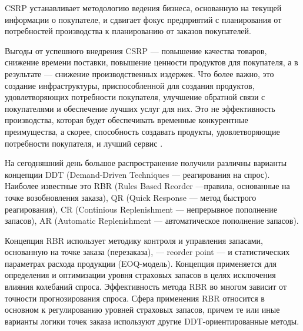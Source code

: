 CSRP устанавливает методологию ведения бизнеса, основанную на текущей информации о покупателе, и сдвигает фокус предприятий с планирования от потребностей производства к планированию от заказов покупателей.

Выгоды от успешного внедрения CSRP --- повышение качества товаров, снижение времени поставки, повышение ценности продуктов для покупателя, а в результате --- снижение производственных издержек.
Что более важно, это создание инфраструктуры, приспособленной для создания продуктов, удовлетворяющих потребности покупателя, улучшение обратной связи с покупателями и обеспечение лучших услуг для них.
Это не эффективность производства, которая будет обеспечивать временные конкурентные преимущества, а скорее, способность создавать продукты, удовлетворяющие потребности покупателя, и лучший сервис \cite[с. 490--491]{grigoryev}.

На сегодняшний день большое распространение получили различны варианты концепции DDT (Demand-Driven Techniques --- реагирования на спрос).
Наиболее известные это RBR (Rules Based Reorder ---правила, основанные на точке возобновления заказа), QR (Quick Response --- метод быстрого реагирования), CR (Continious Replenishment --- непрерывное пополнение запасов), AR (Automatic Replenishment --- автоматическое пополнение запасов).

Концепция RBR использует методику контроля и управления запасами, основанную на точке заказа (перезаказа), --- reorder point --- и статистических параметрах расхода продукции (EOQ-модель).
Концепция применяется для определения и оптимизации уровня страховых запасов в целях исключения влияния колебаний спроса.
Эффективность метода RBR во многом зависит от точности прогнозирования спроса.
Сфера применения RBR относится в основном к регулированию уровней страховых запасов, причем те или иные варианты логики точек заказа используют другие DDT-ориентированные методы.






